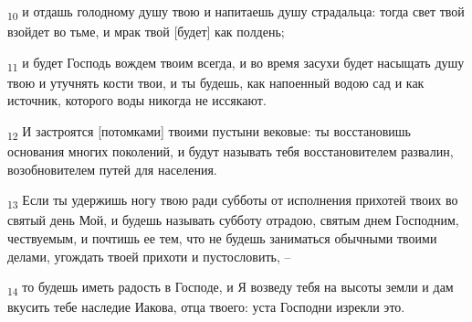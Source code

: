 \begin{tcolorbox}
\textsubscript{10} и отдашь голодному душу твою и напитаешь душу страдальца: тогда свет твой взойдет во тьме, и мрак твой [будет] как полдень;
\end{tcolorbox}
\begin{tcolorbox}
\textsubscript{11} и будет Господь вождем твоим всегда, и во время засухи будет насыщать душу твою и утучнять кости твои, и ты будешь, как напоенный водою сад и как источник, которого воды никогда не иссякают.
\end{tcolorbox}
\begin{tcolorbox}
\textsubscript{12} И застроятся [потомками] твоими пустыни вековые: ты восстановишь основания многих поколений, и будут называть тебя восстановителем развалин, возобновителем путей для населения.
\end{tcolorbox}
\begin{tcolorbox}
\textsubscript{13} Если ты удержишь ногу твою ради субботы от исполнения прихотей твоих во святый день Мой, и будешь называть субботу отрадою, святым днем Господним, чествуемым, и почтишь ее тем, что не будешь заниматься обычными твоими делами, угождать твоей прихоти и пустословить, --
\end{tcolorbox}
\begin{tcolorbox}
\textsubscript{14} то будешь иметь радость в Господе, и Я возведу тебя на высоты земли и дам вкусить тебе наследие Иакова, отца твоего: уста Господни изрекли это.
\end{tcolorbox}
